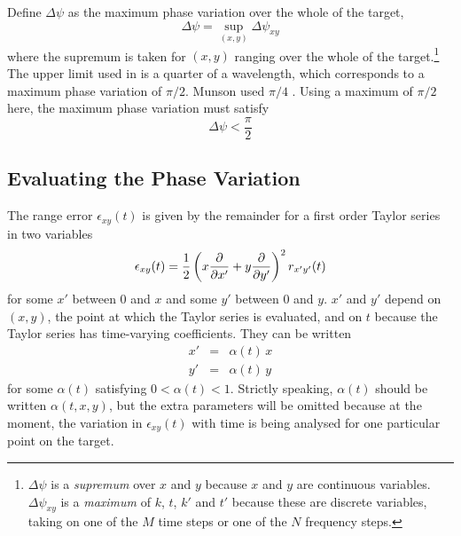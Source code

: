 Define $\Delta\psi$ as the maximum phase variation over the whole of the 
target,
\begin{equation}\label{rmc eqn:dphi def}
\Delta\psi=\sup_{(x,y)} \Delta\psi_{xy}
\end{equation}
where the supremum is taken for $(x,y)$ ranging over the whole of the
target.\footnote{$\Delta\psi$ is a {\em supremum\/} over $x$ and $y$ because
$x$ and $y$ are continuous variables.  $\Delta\psi_{xy}$ is a {\em
maximum\/} of $k$, $t$, $k'$ and $t'$ because these are discrete variables,
taking on one of the $M$ time steps or one of the $N$ frequency steps.}
The upper limit used in \cite{Aus84} is a quarter of a wavelength, which
corresponds to a maximum phase variation of $\pi/2$.  Munson used $\pi/4$
\cite{Mun83}.  Using a maximum of $\pi/2$ here, the maximum phase variation
must satisfy 
\begin{equation}\label{rmc eqn:dphi lim}
\Delta\psi<\frac{\pi}{2}
\end{equation}

\subsection{Evaluating the Phase Variation}

The range error $\epsilon_{xy}(t)$ is given by the remainder for a first
order Taylor series in two variables
\begin{equation}
\epsilon_{xy}(t)=\frac{1}{2}
\left(x\frac{{\partial}}{{\partial} x'}+y\frac{{\partial}}{{\partial} y'}\right)^2 r_{x'y'}(t)
\end{equation}
for some $x'$ between $0$ and $x$ and some $y'$ between $0$ and $y$.  
$x'$ and $y'$ depend on $(x,y)$, the point at which the Taylor series is 
evaluated, and on $t$ because the Taylor series has time-varying coefficients.  
They can be written
\begin{eqnarray}
x'&=&\alpha(t)\,x\\
y'&=&\alpha(t)\,y
\end{eqnarray}
for some $\alpha(t)$ satisfying $0<\alpha(t)<1$.  Strictly speaking,
$\alpha(t)$ should be written $\alpha(t,x,y)$, but the extra parameters will
be omitted because at the moment, the variation in $\epsilon_{xy}(t)$ with
time is being analysed for one particular point on the target.  

